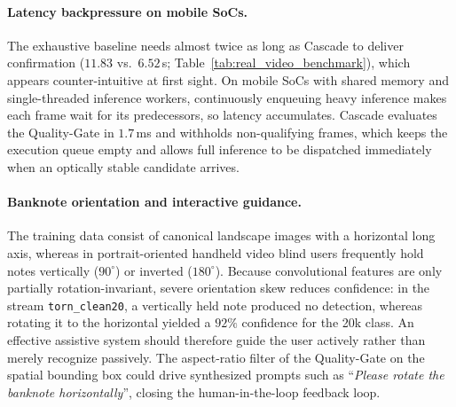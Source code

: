 \documentclass[final,5p,times,twocolumn,authoryear]{elsarticle}
\begin{document}
\paragraph{Latency backpressure on mobile SoCs.}
The exhaustive baseline needs almost twice as long as Cascade to deliver confirmation ($11.83$ vs.\ $6.52$\,s; Table~\ref{tab:real_video_benchmark}), which appears counter-intuitive at first sight. On mobile SoCs with shared memory and single-threaded inference workers, continuously enqueuing heavy inference makes each frame wait for its predecessors, so latency accumulates. Cascade evaluates the Quality-Gate in $1.7$\,ms and withholds non-qualifying frames, which keeps the execution queue empty and allows full inference to be dispatched immediately when an optically stable candidate arrives.

\paragraph{Banknote orientation and interactive guidance.}
The training data consist of canonical landscape images with a horizontal long axis, whereas in portrait-oriented handheld video blind users frequently hold notes vertically ($90^\circ$) or inverted ($180^\circ$). Because convolutional features are only partially rotation-invariant, severe orientation skew reduces confidence: in the stream \texttt{torn\_clean20}, a vertically held note produced no detection, whereas rotating it to the horizontal yielded a $92\%$ confidence for the 20k class. An effective assistive system should therefore guide the user actively rather than merely recognize passively. The aspect-ratio filter of the Quality-Gate on the spatial bounding box could drive synthesized prompts such as ``\textit{Please rotate the banknote horizontally}'', closing the human-in-the-loop feedback loop.
\end{document}
